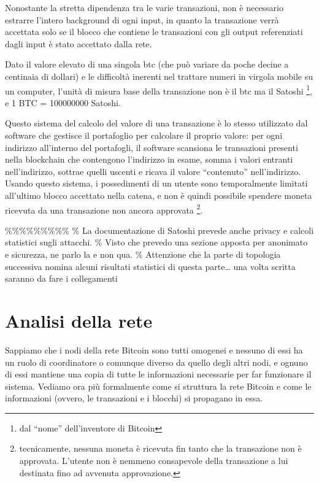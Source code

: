 Nonostante la stretta dipendenza tra le varie transazioni, non è necessario estrarre l'intero background di ogni input, in quanto la transazione verrà accettata solo se il blocco che contiene le transazioni con gli output referenziati dagli input è stato accettato dalla rete.

Dato il valore elevato di una singola btc (che può variare da poche decine a centinaia di dollari) e le difficoltà inerenti nel trattare numeri in virgola mobile su un computer, l'unità di misura base della transazione non è il btc ma il Satoshi \footnote{dal ``nome''   dell'inventore di Bitcoin}, e 1 BTC = 100000000 Satoshi.

Questo sistema del calcolo del valore di una transazione è lo stesso utilizzato dal software che gestisce il portafoglio per calcolare il proprio valore: per ogni indirizzo all'interno del portafogli, il software scansiona le transazioni presenti nella blockchain che contengono l'indirizzo in esame, somma i valori entranti nell'indirizzo, sottrae quelli uscenti e ricava il valore ``contenuto'' nell'indirizzo. Usando questo sistema, i possedimenti di un utente sono temporalmente limitati all'ultimo blocco accettato nella catena, e non è quindi possibile spendere moneta ricevuta da una transazione non ancora approvata \footnote{tecnicamente, nessuna moneta è ricevuta fin tanto   che la transazione non è approvata. L'utente non è nemmeno consapevole   della transazione a lui destinata fino ad avvenuta approvazione.}.

\%\%\%\%\%\%\%\%\% \% La documentazione di Satoshi prevede anche privacy e calcoli statistici sugli attacchi. \% Visto che prevedo una sezione apposta per anonimato e sicurezza, ne parlo la e non qua. \% Attenzione che la parte di topologia successiva nomina alcuni risultati statistici di questa parte\ldots{} una volta scritta saranno da fare i collegamenti

\section{Analisi della rete}\label{analisi-della-rete}

Sappiamo che i nodi della rete Bitcoin sono tutti omogenei e nessuno di essi ha un ruolo di coordinatore o comunque diverso da quello degli altri nodi, e ognuno di essi mantiene una copia di tutte le informazioni necessarie per far funzionare il sistema. Vediamo ora più formalmente come si struttura la rete Bitcoin e come le informazioni (ovvero, le transazioni e i blocchi) si propagano in essa.

